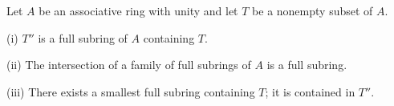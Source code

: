 Let $A$ be an associative ring with unity and let $T$ be a nonempty subset of $A$.

(i) $T''$ is a full subring of $A$ containing $T$.

(ii) The intersection of a family of full subrings of $A$ is a full subring.

(iii) There exists a smallest full subring containing $T$; it is contained in $T''$.
